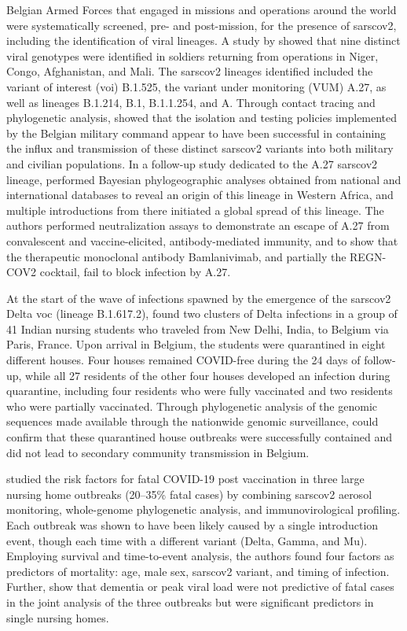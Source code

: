 Belgian Armed Forces that engaged in missions and operations around the world were systematically screened, pre- and post-mission, for the presence of \gls{sarscov2}, including the identification of viral lineages.
A study by \citet{pirnay2021variant} showed that nine distinct viral genotypes were identified in soldiers returning from operations in Niger, Congo, Afghanistan, and Mali.
The \gls{sarscov2} lineages identified included the variant of interest (\gls{voi}) B.1.525, the variant under monitoring (VUM) A.27, as well as lineages B.1.214, B.1, B.1.1.254, and A.
Through contact tracing and phylogenetic analysis, \citet{pirnay2021variant} showed that the isolation and testing policies implemented by the Belgian military command appear to have been successful in containing the influx and transmission of these distinct \gls{sarscov2} variants into both military and civilian populations.
In a follow-up study dedicated to the A.27 \gls{sarscov2} lineage, \citet{kaleta2022antibody} performed Bayesian phylogeographic analyses obtained from national and international databases to reveal an origin of this lineage in Western Africa, and multiple introductions from there initiated a global spread of this lineage.
The authors performed neutralization assays to demonstrate an escape of A.27 from convalescent and vaccine-elicited, antibody-mediated immunity, and to show that the therapeutic monoclonal antibody Bamlanivimab, and partially the REGN-COV2 cocktail, fail to block infection by A.27.

At the start of the wave of infections spawned by the emergence of the \gls{sarscov2} Delta \gls{voc} (lineage B.1.617.2), \citet{vanelslande2022two} found two clusters of Delta infections in a group of 41 Indian nursing students who traveled from New Delhi, India, to Belgium via Paris, France.
Upon arrival in Belgium, the students were quarantined in eight different houses.
Four houses remained COVID-free during the 24 days of follow-up, while all 27 residents of the other four houses developed an infection during quarantine, including four residents who were fully vaccinated and two residents who were partially vaccinated.
Through phylogenetic analysis of the genomic sequences made available through the nationwide genomic surveillance, \citet{vanelslande2022two} could confirm that these quarantined house outbreaks were successfully contained and did not lead to secondary community transmission in Belgium.

\citet{cuypers2022comprehensive} studied the risk factors for fatal COVID-19 post vaccination in three large nursing home outbreaks (20--35\% fatal cases) by combining \gls{sarscov2} aerosol monitoring, whole-genome phylogenetic analysis, and immunovirological profiling.
Each outbreak was shown to have been likely caused by a single introduction event, though each time with a different variant (Delta, Gamma, and Mu).
Employing survival and time-to-event analysis, the authors found four factors as predictors of mortality: age, male sex, \gls{sarscov2} variant, and timing of infection.
Further, \citet{cuypers2022comprehensive} show that dementia or peak viral load were not predictive of fatal cases in the joint analysis of the three outbreaks but were significant predictors in single nursing homes.

